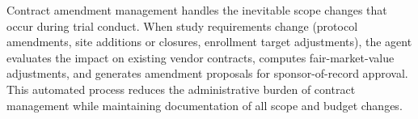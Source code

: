 Contract amendment management handles the inevitable scope changes that occur during
trial conduct. When study requirements change (protocol amendments, site additions or
closures, enrollment target adjustments), the agent evaluates the impact on existing
vendor contracts, computes fair-market-value adjustments, and generates amendment
proposals for sponsor-of-record approval. This automated process reduces the
administrative burden of contract management while maintaining documentation of all
scope and budget changes.
